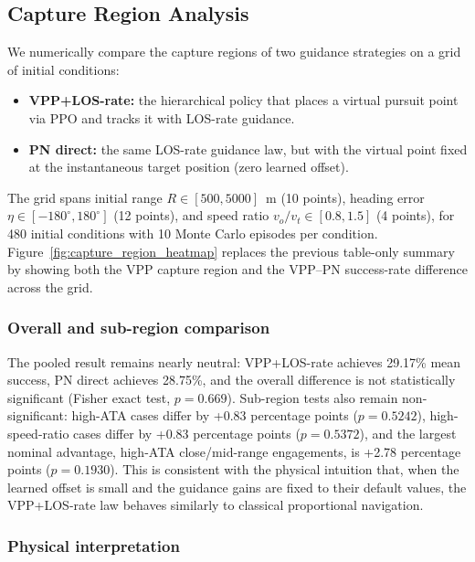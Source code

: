 \subsection{Capture Region Analysis}\label{sec:capture_region}

We numerically compare the capture regions of two guidance strategies on a grid of initial conditions:
\begin{itemize}
    \item \textbf{VPP+LOS-rate:} the hierarchical policy that places a virtual pursuit point via PPO and tracks it with LOS-rate guidance.
    \item \textbf{PN direct:} the same LOS-rate guidance law, but with the virtual point fixed at the instantaneous target position (zero learned offset).
\end{itemize}

The grid spans initial range $R \in [500, 5000]$~m (10 points), heading error $\eta \in [-180^{\circ}, 180^{\circ}]$ (12 points), and speed ratio $v_o/v_t \in [0.8, 1.5]$ (4 points), for 480 initial conditions with 10 Monte Carlo episodes per condition. Figure~\ref{fig:capture_region_heatmap} replaces the previous table-only summary by showing both the VPP capture region and the VPP--PN success-rate difference across the grid.



\subsubsection{Overall and sub-region comparison}

The pooled result remains nearly neutral: VPP+LOS-rate achieves 29.17\% mean success, PN direct achieves 28.75\%, and the overall difference is not statistically significant (Fisher exact test, $p = 0.669$). Sub-region tests also remain non-significant: high-ATA cases differ by +0.83 percentage points ($p=0.5242$), high-speed-ratio cases differ by +0.83 percentage points ($p=0.5372$), and the largest nominal advantage, high-ATA close/mid-range engagements, is +2.78 percentage points ($p=0.1930$). This is consistent with the physical intuition that, when the learned offset is small and the guidance gains are fixed to their default values, the VPP+LOS-rate law behaves similarly to classical proportional navigation.

\subsubsection{Physical interpretation}


